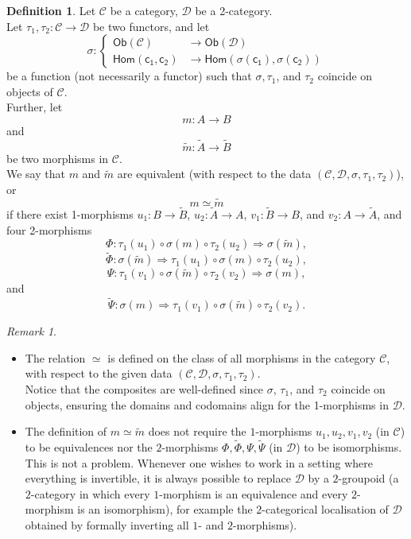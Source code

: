 \documentclass[a4paper,10pt]{article}
\theoremstyle{plain}
\theoremstyle{definition}
\newtheorem{definition}[theorem]{Definition}
\theoremstyle{remark}
\newtheorem{remark}[theorem]{Remark}
\begin{document}
\begin{definition}
  \label{definition-master}
  Let $\mathcal{C}$ be a category, $\mathcal{D}$ be a 2-category. \\
  Let $\tau_1,\tau_2 : \mathcal{C} \to \mathcal{D}$ be two functors, and let
  \[ \sigma : \begin{cases} \mathsf{Ob(\mathcal{C})} &\to \mathsf{Ob(\mathcal{D})} \\ \mathsf{Hom(c_1,c_2)} &\to \mathsf{Hom(\sigma(c_1),\sigma(c_2))} \end{cases} \]
  be a function (not necessarily a functor) such that $\sigma, \tau_1$, and $\tau_2$ coincide on objects of $\mathcal{C}$. \\
  Further, let
  \[ m : A \to B \]
  and
  \[ \tilde{m} : \tilde{A} \to \tilde{B} \]
  be two morphisms in $\mathcal{C}$.  \\
  We say that $m$ and $\tilde{m}$ are equivalent (with respect to the data $(\mathcal{C},\mathcal{D},\sigma,\tau_1,\tau_2)$), or
  \[ m \simeq \tilde{m} \]
  if there exist 1-morphisms $u_1 : B \to \tilde{B}$, $u_2 : \tilde{A} \to A$, $v_1 : \tilde{B} \to B$, and $v_2 : A \to \tilde{A}$, and four 2-morphisms
  \[ \Phi : \tau_1(u_1) \circ \sigma(m) \circ \tau_2(u_2) \Rightarrow \sigma(\tilde{m}), \]
  \[ \tilde{\Phi} : \sigma(\tilde{m}) \Rightarrow \tau_1(u_1) \circ \sigma(m) \circ \tau_2(u_2), \]
  \[ \Psi : \tau_1(v_1) \circ \sigma(\tilde{m}) \circ \tau_2(v_2) \Rightarrow \sigma(m), \]
  and
  \[ \tilde{\Psi} : \sigma(m) \Rightarrow \tau_1(v_1) \circ \sigma(\tilde{m}) \circ \tau_2(v_2) . \]
\end{definition}

\begin{remark}
  \mbox{} \\
  \begin{itemize}
    \item The relation \(\simeq\) is defined on the class of all morphisms in the category \(\mathcal{C}\), with respect to the given data \((\mathcal{C}, \mathcal{D}, \sigma, \tau_1, \tau_2)\). \\
          Notice that the composites are well-defined since \(\sigma\), \(\tau_1\), and \(\tau_2\) coincide on objects, ensuring the domains and codomains align for the 1-morphisms in \(\mathcal{D}\).
    \item The definition of $  m \simeq \tilde{m}  $ does not require the $  1  $-morphisms $  u_1,u_2,v_1,v_2  $ (in $  \mathcal{C}  $) to be equivalences nor the $  2  $-morphisms $  \Phi,\tilde{\Phi},\Psi,\tilde{\Psi}  $ (in $  \mathcal{D}  $) to be isomorphisms. This is not a problem. Whenever one wishes to work in a setting where everything is invertible, it is always possible to replace $  \mathcal{D}  $ by a $  2  $-groupoid (a $  2  $-category in which every $  1  $-morphism is an equivalence and every $  2  $-morphism is an isomorphism), for example the $  2  $-categorical localisation of $  \mathcal{D}  $ obtained by formally inverting all $  1  $- and $  2  $-morphisms).
  \end{itemize}
\end{remark}
\end{document}
